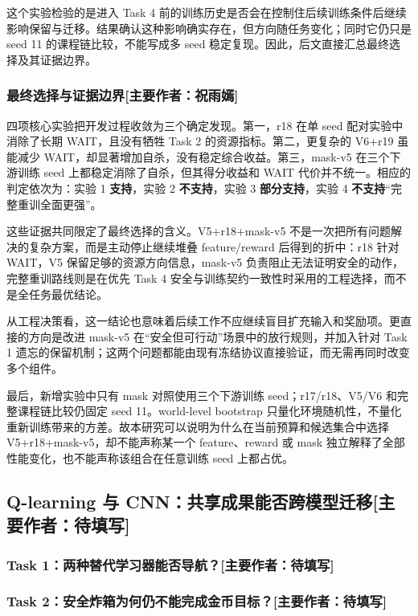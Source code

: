\documentclass[UTF8,11pt,a4paper,fontset=none]{ctexart}
\newcommand{\primaryauthor}[1]{\texorpdfstring{\enspace\normalfont\small[主要作者：#1]}{ [主要作者：#1]}}
\newcommand{\authorsubsection}[2]{\subsection{#1\primaryauthor{#2}}}
\newcommand{\authorsubsubsection}[2]{\subsubsection{#1\primaryauthor{#2}}}
\newcommand{\pendingauthor}{待填写}
\newif\ifdraftguidance
\newcommand{\writingnote}[1]{%
  \ifdraftguidance
    \par\noindent\begingroup\color{promptblue}\small
    \fbox{\begin{minipage}{0.94\linewidth}\textbf{写作提示：}#1\end{minipage}}%
    \par\endgroup
  \fi
}
\newcommand{\todoitem}[1]{%
  \ifdraftguidance\textcolor{promptblue}{\textbf{[待补：#1]}}\fi
}
\begin{document}
这个实验检验的是进入 Task 4 前的训练历史是否会在控制住后续训练条件后继续影响保留与迁移。结果确认这种影响确实存在，但方向随任务变化；同时它仍只是 seed 11 的课程链比较，不能写成多 seed 稳定复现。因此，后文直接汇总最终选择及其证据边界。

\authorsubsubsection{最终选择与证据边界}{祝雨嫣}

四项核心实验把开发过程收敛为三个确定发现。第一，r18 在单 seed 配对实验中消除了长期 WAIT，且没有牺牲 Task 2 的资源指标。第二，更复杂的 V6+r19 虽能减少 WAIT，却显著增加自杀，没有稳定综合收益。第三，mask-v5 在三个下游训练 seed 上都稳定消除了自杀，但其得分收益和 WAIT 代价并不统一。相应的判定依次为：实验 1 \textbf{支持}，实验 2 \textbf{不支持}，实验 3 \textbf{部分支持}，实验 4 \textbf{不支持}“完整重训全面更强”。

这些证据共同限定了最终选择的含义。V5+r18+mask-v5 不是一次把所有问题解决的复杂方案，而是主动停止继续堆叠 feature/reward 后得到的折中：r18 针对 WAIT，V5 保留足够的资源方向信息，mask-v5 负责阻止无法证明安全的动作，完整重训路线则是在优先 Task 4 安全与训练契约一致性时采用的工程选择，而不是全任务最优结论。

从工程决策看，这一结论也意味着后续工作不应继续盲目扩充输入和奖励项。更直接的方向是改进 mask-v5 在“安全但可行动”场景中的放行规则，并加入针对 Task 1 遗忘的保留机制；这两个问题都能由现有冻结协议直接验证，而无需再同时改变多个组件。

最后，新增实验中只有 mask 对照使用三个下游训练 seed；r17/r18、V5/V6 和完整课程链比较仍固定 seed 11。world-level bootstrap 只量化环境随机性，不量化重新训练带来的方差。故本研究可以说明为什么在当前预算和候选集合中选择 V5+r18+mask-v5，却不能声称某一个 feature、reward 或 mask 独立解释了全部性能变化，也不能声称该组合在任意训练 seed 上都占优。

\authorsubsection{Q-learning 与 CNN：共享成果能否跨模型迁移}{\pendingauthor}

\authorsubsubsection{Task 1：两种替代学习器能否导航？}{\pendingauthor}
\writingnote{按统一七步叙事写作。Double Q($\lambda$) 为 48.95 coins、96\% all-coins；Distilled CNN 为 49.84 coins、96\% all-coins；额外 TD fine-tuning 退化到 37.21 coins、55\% all-coins。}
\todoitem{正文}

\authorsubsubsection{Task 2：安全炸箱为何仍不能完成金币目标？}{\pendingauthor}
\writingnote{按统一七步叙事写作。Q r20 为 3.95/9 coins、53.45 crates、0\% suicide、75\% long ping-pong；CNN D02 为 2.60/9 coins、44.15 crates、0\% suicide、0\% all-coins；共同瓶颈是箱后长期目标重选；两者未通过 Task 2，因此停止进入 Task 3/4。}
\todoitem{正文与 Table 3：Q/CNN Task 1--2 代表结果}
\end{document}
